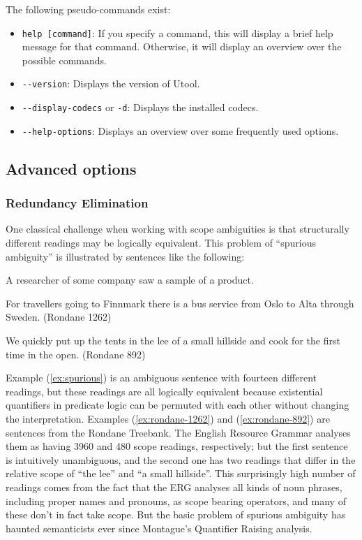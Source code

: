 The following pseudo-commands exist:

\begin{itemize}
\item \verb?help [command]?: If you specify a command, this will
display a brief help message for that command. Otherwise, it will
display an overview over the possible commands.
\item \verb?--version?: Displays the version of Utool.
\item \verb?--display-codecs? or \verb?-d?: Displays the installed
codecs.
\item \verb?--help-options?: Displays an overview over some frequently
used options.
\end{itemize}




\subsection{Advanced options}

\subsubsection{Redundancy Elimination} \label{sec:redund-elim}

One classical challenge when working with scope ambiguities is that
structurally different readings may be logically equivalent. This
problem of ``spurious ambiguity'' is illustrated by sentences like the
following:

\begin{examples}
\item \label{ex:spurious}
A researcher of some company saw a sample of a product.
\item
  \label{ex:rondane-1262} 
  For travellers going to Finnmark there is a bus service from Oslo to
  Alta through Sweden. (Rondane 1262)
\item 
  \label{ex:rondane-892}
  We quickly put up the tents in the lee of a small hillside and cook
  for the first time in the open. (Rondane 892)
\end{examples}

Example (\ref{ex:spurious}) is an ambiguous sentence with fourteen
different readings, but these readings are all logically equivalent
because existential quantifiers in predicate logic can be permuted
with each other without changing the interpretation. Examples
(\ref{ex:rondane-1262}) and (\ref{ex:rondane-892}) are sentences from
the Rondane Treebank. The English Resource Grammar analyses them as
having 3960 and 480 scope readings, respectively; but the first
sentence is intuitively unambiguous, and the second one has two
readings that differ in the relative scope of ``the lee'' and ``a
small hillside''. This surprisingly high number of readings comes from
the fact that the ERG analyses all kinds of noun phrases, including
proper names and pronouns, as scope bearing operators, and many of
these don't in fact take scope. But the basic problem of spurious
ambiguity has haunted semanticists ever since Montague's Quantifier
Raising analysis.

